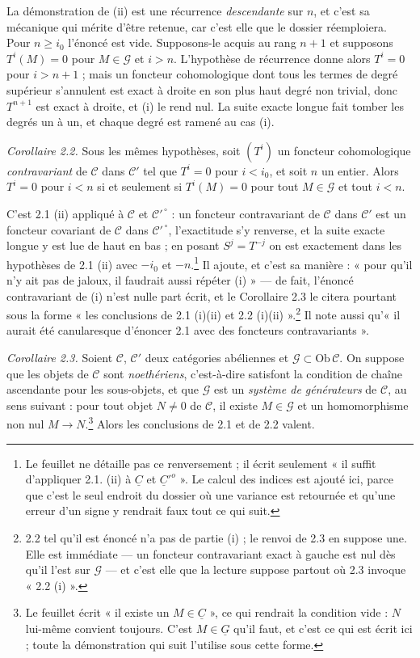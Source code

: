\documentclass[11pt,a4paper]{article}
\begin{document}
La démonstration de (ii) est une récurrence \emph{descendante} sur $n$, et
c'est sa mécanique qui mérite d'être retenue, car c'est elle que le dossier
réemploiera. Pour $n \geqslant i_{0}$ l'énoncé est vide. Supposons-le acquis au
rang $n+1$ et supposons $T^{i}(M) = 0$ pour $M \in \mathcal{G}$ et $i > n$.
L'hypothèse de récurrence donne alors $T^{i} = 0$ pour $i > n+1$ ; mais un
foncteur cohomologique dont tous les termes de degré supérieur s'annulent est
exact à droite en son plus haut degré non trivial, donc $T^{n+1}$ est exact à
droite, et (i) le rend nul. La suite exacte longue fait tomber les degrés un à
un, et chaque degré est ramené au cas (i).

\emph{Corollaire 2.2.} Sous les mêmes hypothèses, soit $(T^{i})$ un foncteur
cohomologique \emph{contravariant} de $\mathcal{C}$ dans $\mathcal{C}'$ tel que
$T^{i} = 0$ pour $i < i_{0}$, et soit $n$ un entier. Alors $T^{i} = 0$ pour
$i < n$ si et seulement si $T^{i}(M) = 0$ pour tout $M \in \mathcal{G}$ et tout
$i < n$.

C'est 2.1 (ii) appliqué à $\mathcal{C}$ et $\mathcal{C}'^{\,\circ}$ : un
foncteur contravariant de $\mathcal{C}$ dans $\mathcal{C}'$ est un foncteur
covariant de $\mathcal{C}$ dans $\mathcal{C}'^{\,\circ}$, l'exactitude s'y
renverse, et la suite exacte longue y est lue de haut en bas ; en posant
$S^{j} = T^{-j}$ on est exactement dans les hypothèses de 2.1 (ii) avec
$-i_{0}$ et $-n$.\footnote{Le feuillet ne détaille pas ce renversement ; il
écrit seulement « il suffit d'appliquer 2.1. (ii) à $\underline{C}$ et
$\underline{C}'^{o}$ ». Le calcul des indices est ajouté ici, parce que c'est le
seul endroit du dossier où une variance est retournée et qu'une erreur d'un
signe y rendrait faux tout ce qui suit.} Il ajoute, et c'est sa manière : « pour
qu'il n'y ait pas de jaloux, il faudrait aussi répéter (i) » — de fait, l'énoncé
contravariant de (i) n'est nulle part écrit, et le Corollaire 2.3 le citera
pourtant sous la forme « les conclusions de 2.1 (i)(ii) et 2.2 (i)(ii)
».\footnote{2.2 tel qu'il est énoncé n'a pas de partie (i) ; le renvoi de 2.3 en
suppose une. Elle est immédiate — un foncteur contravariant exact à gauche est
nul dès qu'il l'est sur $\mathcal{G}$ — et c'est elle que la lecture suppose
partout où 2.3 invoque « 2.2 (i) ».} Il note aussi qu'« il aurait été
canularesque d'énoncer 2.1 avec des foncteurs contravariants ».

\emph{Corollaire 2.3.} Soient $\mathcal{C}$, $\mathcal{C}'$ deux catégories
abéliennes et $\mathcal{G} \subset \mathrm{Ob}\,\mathcal{C}$. On suppose que les
objets de $\mathcal{C}$ sont \emph{noethériens}, c'est-à-dire satisfont la
condition de chaîne ascendante pour les sous-objets, et que $\mathcal{G}$ est un
\emph{système de générateurs} de $\mathcal{C}$, au sens suivant : pour tout
objet $N \neq 0$ de $\mathcal{C}$, il existe $M \in \mathcal{G}$ et un
homomorphisme non nul $M \to N$.\footnote{Le feuillet écrit « il existe un
$M \in \underline{C}$ », ce qui rendrait la condition vide : $N$ lui-même
convient toujours. C'est $M \in \underline{G}$ qu'il faut, et c'est ce qui est
écrit ici ; toute la démonstration qui suit l'utilise sous cette forme.} Alors
les conclusions de 2.1 et de 2.2 valent.
\end{document}
